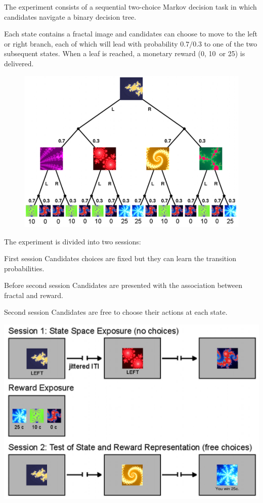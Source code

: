 \begin{casestudy}
    The experiment consists of a sequential two-choice Markov decision task in which candidates navigate a binary decision tree.

    Each state contains a fractal image and
    candidates can choose to move to the left or right branch, each of which will lead with probability $0.7/0.3$ to one of the two subsequent states.
    When a leaf is reached, a monetary reward (0\textcentoldstyle, 10\textcentoldstyle\, or 25\textcentoldstyle) is delivered.
    \begin{figure}[H]
        \centering
        \includegraphics[width=0.4\linewidth]{./img/human_latent_experiment.png}
    \end{figure}

    \begin{minipage}{0.58\linewidth}
        The experiment is divided into two sessions:
        \begin{descriptionlist}
            \item[First session]
                Candidates choices are fixed but they can learn the transition probabilities.
    
            \item[Before second session]
                Candidates are presented with the association between fractal and reward.
    
            \item[Second session]
                Candidates are free to choose their actions at each state.
        \end{descriptionlist}
    \end{minipage}
    \begin{minipage}{0.4\linewidth}
        \centering
        \includegraphics[width=0.95\linewidth]{./img/human_latent_experiment2.png}
    \end{minipage}\\[1em]


\end{casestudy}
